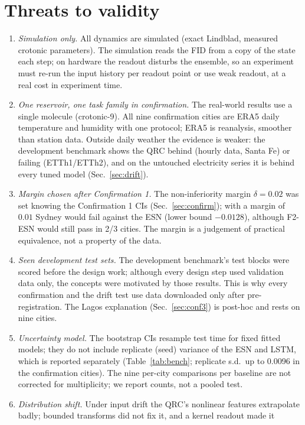 \documentclass[aps,prresearch,preprint,superscriptaddress,amsmath,amssymb,floatfix]{revtex4-2}
\begin{document}
\section{Threats to validity}\label{sec:threats}
\begin{enumerate}
\item \emph{Simulation only.} All dynamics are simulated (exact Lindblad, measured
crotonic parameters). The simulation reads the FID from a copy of the state each step;
on hardware the readout disturbs the ensemble, so an experiment must re-run the input
history per readout point or use weak readout, at a real cost in experiment time.
\item \emph{One reservoir, one task family in confirmation.} The real-world results use a
single molecule (crotonic-9). All nine confirmation cities are ERA5 daily temperature
and humidity with one protocol; ERA5 is reanalysis, smoother than station data. Outside
daily weather the evidence is weaker: the development benchmark shows the QRC behind
(hourly data, Santa Fe) or failing (ETTh1/ETTh2), and on the untouched electricity
series it is behind every tuned model (Sec.~\ref{sec:drift}).
\item \emph{Margin chosen after Confirmation 1.} The non-inferiority margin $\delta=0.02$
was set knowing the Confirmation 1 CIs (Sec.~\ref{sec:confirm}); with a margin of $0.01$
Sydney would fail against the ESN (lower bound $-0.0128$), although F2-ESN would still
pass in 2/3 cities. The margin is
a judgement of practical equivalence, not a property of the data.
\item \emph{Seen development test sets.} The development benchmark's test blocks were
scored before the design work; although every design step used validation data only,
the concepts were motivated by those results. This is why every confirmation and the
drift test use data downloaded only after pre-registration. The Lagos explanation
(Sec.~\ref{sec:conf3}) is post-hoc and rests on nine cities.
\item \emph{Uncertainty model.} The bootstrap CIs resample test time for fixed fitted
models; they do not include replicate (seed) variance of the ESN and LSTM, which is
reported separately (Table~\ref{tab:bench}; replicate s.d.\ up to 0.0096 in the
confirmation cities). The
nine per-city comparisons per baseline are not corrected for multiplicity; we report
counts, not a pooled test.
\item \emph{Distribution shift.} Under input drift the QRC's nonlinear features
extrapolate badly; bounded transforms did not fix it, and a kernel readout made it

\end{enumerate}
\end{document}
